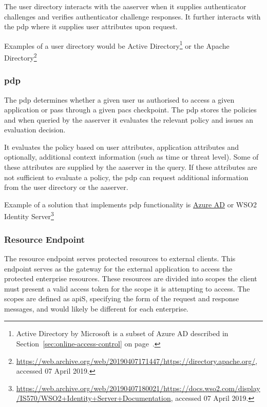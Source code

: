 The user directory interacts with the \acrshort{aaserver} when it supplies authenticator challenges and verifies authenticator challenge responses. It further interacts with the \acrshort{pdp} where it supplies user attributes upon request.

Examples of a user directory would be Active Directory\footnote{Active Directory by Microsoft is a subset of Azure AD described in Section~\ref{sec:online-access-control} on page~\pageref{sec:online-access-control}.} or the Apache Directory\footnote{\url{https://web.archive.org/web/20190407171447/https://directory.apache.org/}, accessed 07 April 2019.}
    
\subsubsection{\acrlong{pdp}}
The \acrfull{pdp} determines whether a given user us authorised to access a given application or pass through a given \acrshort{pacs} checkpoint. The \acrshort{pdp} stores the policies and when queried by the \acrshort{aaserver} it evaluates the relevant policy and issues an evaluation decision.

It evaluates the policy based on user attributes, application attributes and optionally, additional context information (such as time or threat level). Some of these attributes are supplied by the \acrshort{aaserver} in the query. If these attributes are not sufficient to evaluate a policy, the \acrshort{pdp} can request additional information from the user directory or the \acrshort{aaserver}.

Example of a solution that implements \acrshort{pdp} functionality is \href{sec:online-access-control}{Azure AD} or WSO2 Identity Server\footnote{\url{https://web.archive.org/web/20190407180021/https://docs.wso2.com/display/IS570/WSO2+Identity+Server+Documentation}, accessed 07 April 2019.}
    
\subsubsection{Resource Endpoint}
The resource endpoint serves protected resources to external clients. This endpoint serves as the gateway for the external application to access the protected enterprise resources. These resources are divided into scopes the client must present a valid access token for the scope it is attempting to access. The scopes are defined as \acrshort{api}S, specifying the form of the request and response messages, and would likely be different for each enterprise.
    
